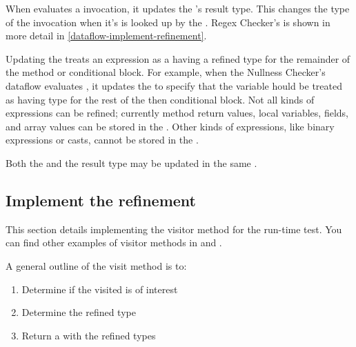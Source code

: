 When  evaluates a
 invocation, it updates the
's result type. This changes the
type of the  invocation when it's
 is looked up by the
.  Regex Checker's
 is shown in more detail in
\ref{dataflow-implement-refinement}.

Updating the  treats an expression as a
having a refined type for the remainder of the method or conditional block. For
example, when the Nullness Checker's dataflow evaluates , it
updates the  to specify that the variable
 hould be treated as having type  for the rest of the
then conditional block.  Not all kinds of expressions can be refined; currently
method return values, local variables, fields, and array values can be stored in
the .  Other kinds of expressions, like
binary expressions or casts, cannot be stored in the
.

Both the  and the result type may be updated
in the same .

\subsection{Implement the refinement\label{dataflow-implement-refinement}}

This section details implementing the visitor method
 for the 
run-time test.  You can find other examples of visitor methods in
 and
.

A general outline of the visit method is to:
\begin{enumerate}
\item Determine if the visited  is of interest
\item Determine the refined type
\item Return a  with the refined
    types
\end{enumerate}


